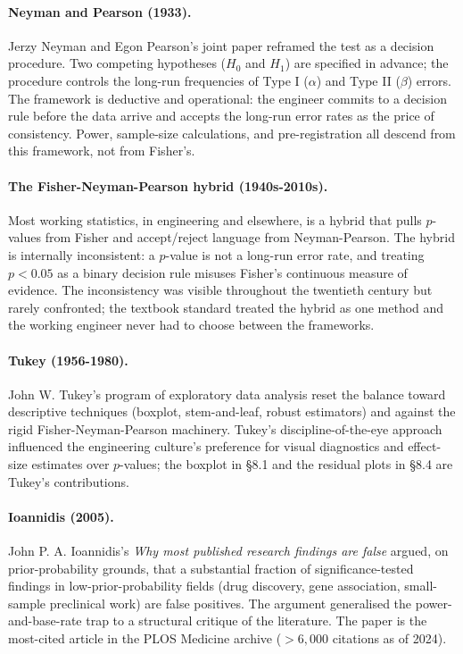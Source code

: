 \paragraph{Neyman and Pearson (1933).} Jerzy Neyman and Egon
Pearson's joint paper \cite{hist:neyman-pearson-1933}
reframed the test as a decision procedure. Two competing
hypotheses ($H_{0}$ and $H_{1}$) are specified in advance;
the procedure controls the long-run frequencies of Type I
($\alpha$) and Type II ($\beta$) errors. The framework is
deductive and operational: the engineer commits to a decision
rule before the data arrive and accepts the long-run error
rates as the price of consistency. Power, sample-size
calculations, and pre-registration all descend from this
framework, not from Fisher's.

\paragraph{The Fisher-Neyman-Pearson hybrid (1940s-2010s).}
Most working statistics, in engineering and elsewhere, is a
hybrid that pulls $p$-values from Fisher and accept/reject
language from Neyman-Pearson. The hybrid is internally
inconsistent: a $p$-value is not a long-run error rate, and
treating $p < 0.05$ as a binary decision rule misuses Fisher's
continuous measure of evidence. The inconsistency was visible
throughout the twentieth century but rarely confronted; the
textbook standard treated the hybrid as one method and the
working engineer never had to choose between the frameworks.

\paragraph{Tukey (1956-1980).} John W. Tukey's program of
exploratory data analysis
\cite{text:ch08t3p-tukey-eda-1977} reset the balance toward
descriptive techniques (boxplot, stem-and-leaf, robust
estimators) and against the rigid Fisher-Neyman-Pearson
machinery. Tukey's discipline-of-the-eye approach influenced
the engineering culture's preference for visual diagnostics
and effect-size estimates over $p$-values; the boxplot in
§8.1 and the residual plots in §8.4 are Tukey's
contributions.

\paragraph{Ioannidis (2005).} John P. A. Ioannidis's
\emph{Why most published research findings are false}
\cite{method:ch08-ioannidis-2005} argued, on prior-probability
grounds, that a substantial fraction of significance-tested
findings in low-prior-probability fields (drug discovery, gene
association, small-sample preclinical work) are false
positives. The argument generalised the power-and-base-rate
trap to a structural critique of the literature. The paper is
the most-cited article in the PLOS Medicine archive
($> 6{,}000$ citations as of 2024).


